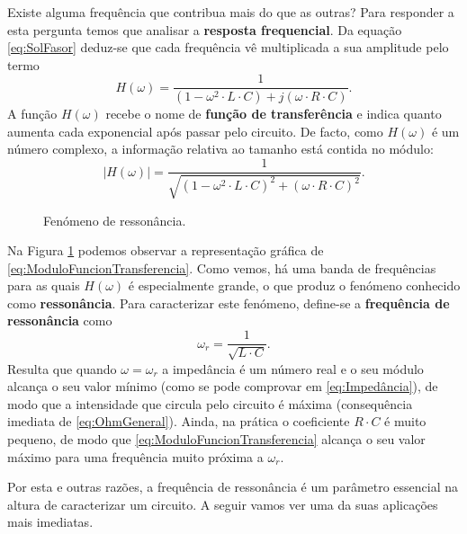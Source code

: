 Existe alguma frequência que contribua mais do que as outras? Para responder a esta pergunta temos que analisar a \textbf{resposta frequencial}. Da equação \eqref{eq:SolFasor} deduz-se que cada frequência vê multiplicada a sua amplitude pelo termo
\begin{equation}
  \label{eq:FuncionTransferencia}
  H(\omega) = \frac{1}{(1-\omega^2 \cdot L\cdot C) + j(\omega \cdot R\cdot C)}.
\end{equation}
A função $H(\omega)$ recebe o nome de \textbf{função de transferência} e indica quanto aumenta cada exponencial após passar pelo circuito. De facto, como $H(\omega)$ é um número complexo, a informação relativa ao tamanho está contida no módulo:
\begin{equation}
  \label{eq:ModuloFuncionTransferencia}
  \left|H(\omega)\right| = \frac{1}{\sqrt{(1-\omega^2\cdot L\cdot C)^2 + (\omega \cdot R\cdot C)^2}}.
\end{equation}

\begin{figure}
\begin{figurebox}
    \vspace{5pt}
    \centering
    \scalebox{0.4}{ }
    \vspace{-10pt}
    \caption{Fenómeno de ressonância.}
    \label{fig:Resonancia}
\end{figurebox}
\end{figure}


Na Figura \ref{fig:Resonancia} podemos observar a representação gráfica de \eqref{eq:ModuloFuncionTransferencia}. Como vemos, há uma banda de frequências para as quais $H(\omega)$ é especialmente grande, o que produz o fenómeno conhecido como \textbf{ressonância}. Para caracterizar este fenómeno, define-se a \textbf{frequência de ressonância} como
\begin{equation}
  \label{eq:FrecuenciaNatural}
  \omega_r = \frac{1}{\sqrt{L\cdot C}}.
\end{equation}
Resulta que quando $\omega=\omega_r$ a impedância é um número real e o seu módulo alcança o seu valor mínimo (como se pode comprovar em \eqref{eq:Impedância}), de modo que a intensidade que circula pelo circuito é máxima (consequência imediata de \eqref{eq:OhmGeneral}). Ainda, na prática o coeficiente $R\cdot C$ é muito pequeno, de modo que \eqref{eq:ModuloFuncionTransferencia} alcança o seu valor máximo para uma frequência muito próxima a $\omega_r$.

Por esta e outras razões, a frequência de ressonância é um parâmetro essencial na altura de caracterizar um circuito. A seguir vamos ver uma da suas aplicações mais imediatas.


